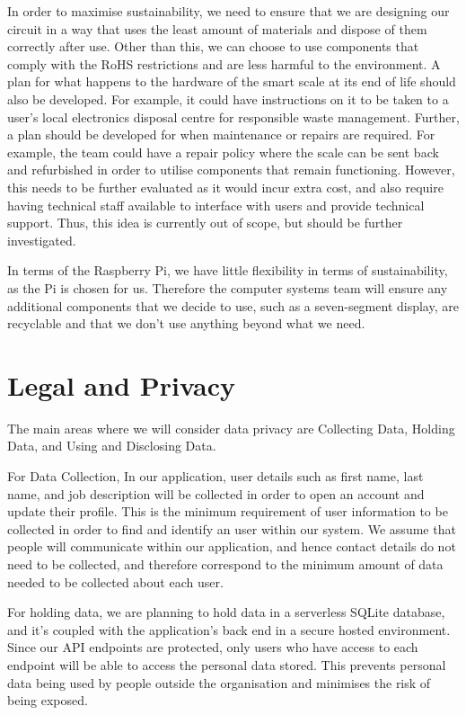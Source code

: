 In order to maximise sustainability, we need to ensure that we are designing our circuit in a way that uses the least amount of materials and dispose of them correctly after use. Other than this, we can choose to use components that comply with the RoHS restrictions and are less harmful to the environment. A plan for what happens to the hardware of the smart scale at its end of life should also be developed. For example, it could have instructions on it to be taken to a user’s local electronics disposal centre for responsible waste management. Further, a plan should be developed for when maintenance or repairs are required. For example, the team could have a repair policy where the scale can be sent back and refurbished in order to utilise components that remain functioning. However, this needs to be further evaluated as it would incur extra cost, and also require having technical staff available to interface with users and provide technical support. Thus, this idea is currently out of scope, but should be further investigated.

In terms of the Raspberry Pi, we have little flexibility in terms of sustainability, as the Pi is chosen for us. Therefore the computer systems team will ensure any additional components that we decide to use, such as a seven-segment display, are recyclable and that we don’t use anything beyond what we need. 


\section{Legal and Privacy}

The main areas where we will consider data privacy are Collecting Data, Holding Data, and Using and Disclosing Data.

For Data Collection, In our application, user details such as first name, last name, and job description will be collected in order to open an account and update their profile. This is the minimum requirement of user information to be collected in order to find and identify an user within our system. We assume that people will communicate within our application, and hence contact details do not need to be collected, and therefore correspond to the minimum amount of data needed to be collected about each user.

For holding data, we are planning to hold data in a serverless SQLite database, and it's coupled with the application's back end in a secure hosted environment. Since our API endpoints are protected, only users who have access to each endpoint will be able to access the personal data stored. This prevents personal data being used by people outside the organisation and minimises the risk of being exposed.

